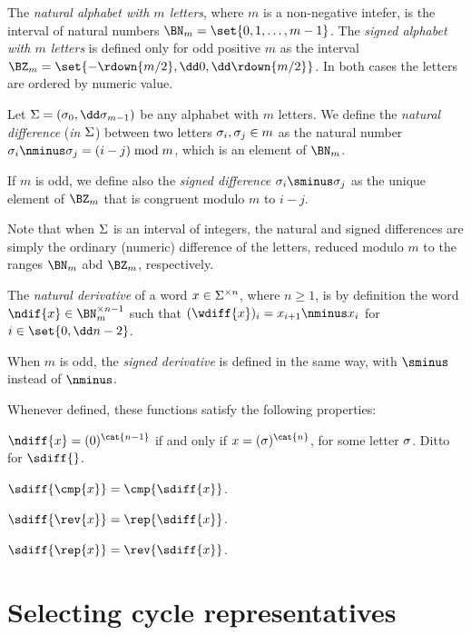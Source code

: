 The {\em natural alphabet with $m$ letters}, where $m$ is a
non-negative intefer, is the interval of natural numbers
$\BN_m=\set{0,1,\dots,m-1}$.  The {\em signed alphabet with $m$
letters} is defined only for odd positive $m$ as the interval
$\BZ_m=\set{-\rdown{m/2},\dd 0,\dd \rdown{m/2}}$. In both cases the 
letters are ordered by numeric value.

Let $\Sig=(\sig_0,\dd\sig_{m-1})$ be any alphabet with $m$ letters.
We define the {\em natural difference} ({\em in $\Sigma$}) between two letters
$\sigma_i,\sigma_j\in m$ as the natural number $\sig_i \nminus \sig_j =
(i-j)\bmod m$, which is an element of $\BN_m$.  

If $m$ is odd, we define also the {\em signed
difference} $\sig_i
\sminus \sig_j$ as the unique element of $\BZ_m$ that is congruent modulo
$m$ to $i-j$.

Note that when $\Sigma$ is an interval of integers, the natural and
signed differences are simply the ordinary (numeric) difference of the
letters, reduced modulo $m$ to the ranges $\BN_m$ abd $\BZ_m$,
respectively.

The {\em natural derivative} of a word $x\in\Sigma^{\times n}$, where $n\geq 1$,
is by definition the word $\ndif{x}\in\BN_m^{\times {n-1}}$ such that 
$(\wdiff{x})_i = x_{i+1} \nminus x_i$ for $i\in\set{0,\dd n-2}$.  

When $m$ is odd, the {\em signed derivative} is defined in the same way, with 
$\sminus$ instead of $\nminus$. 

Whenever defined, these functions satisfy the following properties:

\newcounter{\diffpropct}

\begin{list}{D\arabic{\diffpropct}:}{\usecounter{\diffpropct}}

  \item $\ndiff{x}=(0)^{\cat {n-1}}$ if and only if 
    $x = (\sig)^{\cat{n}}$, for some letter $\sigma$.
    Ditto for $\sdiff{}$.
    
  \item $\sdiff{\cmp{x}} = \cmp{\sdiff{x}}$.
  
  \item $\sdiff{\rev{x}} = \rep{\sdiff{x}}$.
  
  \item $\sdiff{\rep{x}} = \rev{\sdiff{x}}$.
  
\end{list}

\section{Selecting cycle representatives}

